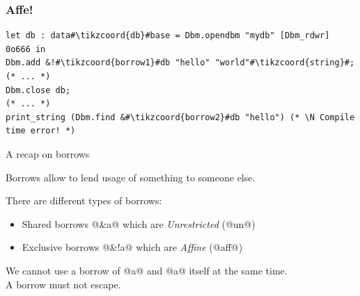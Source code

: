 \documentclass[aspectratio=169,dvipsnames,svgnames,10pt]{beamer}
\newcommand\tikzcoord[1]{%
  \tikz[baseline,remember picture]{\node[coordinate] (#1) {};}}
\newcommand\N{{\color{Red}{\ding{56}}}}
\begin{document}
\begin{frame}[fragile]
  \frametitle{Affe!}

\begin{verbatim}
let db : data#\tikzcoord{db}#base = Dbm.opendbm "mydb" [Dbm_rdwr] 0o666 in
Dbm.add &!#\tikzcoord{borrow1}#db "hello" "world"#\tikzcoord{string}#;
(* ... *)
Dbm.close db;
(* ... *)
print_string (Dbm.find &#\tikzcoord{borrow2}#db "hello") (* \N Compile time error! *)
\end{verbatim}

\end{frame}


\begin{frame}[fragile]{A recap on borrows}


  Borrows allow to lend usage of something to someone else.

  There are different types of borrows:
  \begin{itemize}
  \item Shared borrows @&a@ which are \emph{Unrestricted} (@un@)
  \item Exclusive borrows @&!a@ which are \emph{Affine} (@aff@)
  \end{itemize}

  We cannot use a borrow of @a@ and @a@ itself at the same time.\\
  A borrow must not escape.
\end{frame}
\end{document}
